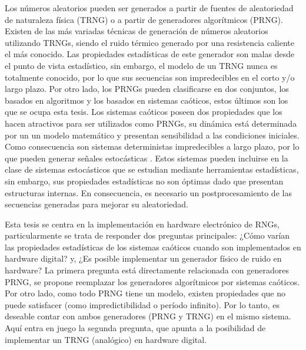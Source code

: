 Los números aleatorios pueden ser generados a partir de fuentes de aleatoriedad de naturaleza física (TRNG) o a partir de generadores algorítmicos (PRNG).
Existen de las más variadas técnicas de generación de números aleatorios utilizando TRNGs, siendo el ruido térmico generado por una resistencia caliente el más conocido.
Las propiedades estadísticas de este generador son malas desde el punto de vista estadístico, sin embargo, el modelo de un TRNG nunca es totalmente conocido, por lo que sus secuencias son impredecibles en el corto y/o largo plazo.
Por otro lado, los PRNGs pueden clasificarse en dos conjuntos, los basados en algoritmos y los basados en sistemas caóticos, estos últimos son los que se ocupa esta tesis.
Los sistemas caóticos poseen dos propiedades que los hacen atractivos para ser utilizados como PRNGs, su dinámica está determinada por un un modelo matemático y presentan sensibilidad a las condiciones iniciales.
Como consecuencia son sistemas deterministas impredecibles a largo plazo, por lo que pueden generar señales estocásticas \cite{Liao2013a}.
Estos sistemas pueden incluirse en la clase de sistemas estocásticos que se estudian mediante herramientas estadísticas, sin embargo, sus propiedades estadísticas no son óptimas dado que presentan estructuras internas.
En consecuencia, es necesario un postprocesamiento de las secuencias generadas para mejorar su aleatoriedad.

Esta tesis se centra en la implementación en hardware electrónico de RNGs, particularmente se trata de responder dos preguntas principales: ¿Cómo varían las propiedades estadísticas de los sistemas caóticos cuando son implementados en hardware digital? y, ¿Es posible implementar un generador físico de ruido en hardware?
La primera pregunta está directamente relacionada con generadores PRNG, se propone reemplazar los generadores algorítmicos por sistemas caóticos.
Por otro lado, como todo PRNG tiene un modelo, existen propiedades que no puede satisfacer (como impredictibilidad o período infinito).
Por lo tanto, es deseable contar con ambos generadores (PRNG y TRNG) en el mismo sistema.
Aquí entra en juego la segunda pregunta, que apunta a la posibilidad de implementar un TRNG (analógico) en hardware digital.

